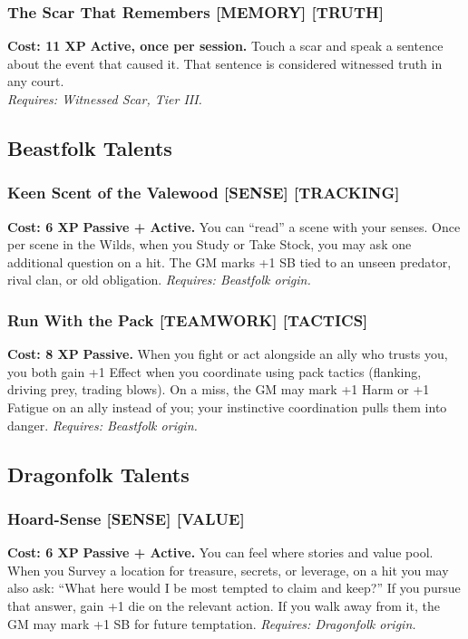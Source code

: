 \documentclass[12pt,a4paper]{book}
\begin{document}
\subsubsection*{The Scar That Remembers \textnormal{[MEMORY] [TRUTH]}}
\label{talent:scar-that-remembers}
\textbf{Cost: 11 XP} \textbf{Active, once per session.} Touch a scar and speak a sentence about the event that caused it. That sentence is considered witnessed truth in any court. \\
\textit{Requires: Witnessed Scar, Tier III.}

\subsection*{Beastfolk Talents}
\label{sec:prestige-beastfolk}

\subsubsection*{Keen Scent of the Valewood \textnormal{[SENSE] [TRACKING]}}
\label{talent:keen-scent-valewood}
\textbf{Cost: 6 XP} \textbf{Passive + Active.} You can ``read'' a scene with your senses. Once per scene in the Wilds, when you Study or Take Stock, you may ask one additional question on a hit. The GM marks +1 SB tied to an unseen predator, rival clan, or old obligation.
\textit{Requires: Beastfolk origin.}

\subsubsection*{Run With the Pack \textnormal{[TEAMWORK] [TACTICS]}}
\label{talent:run-with-the-pack}
\textbf{Cost: 8 XP} \textbf{Passive.} When you fight or act alongside an ally who trusts you, you both gain +1 Effect when you coordinate using pack tactics (flanking, driving prey, trading blows). On a miss, the GM may mark +1 Harm or +1 Fatigue on an ally instead of you; your instinctive coordination pulls them into danger.
\textit{Requires: Beastfolk origin.}

\subsection*{Dragonfolk Talents}
\label{sec:prestige-dragonfolk}

\subsubsection*{Hoard-Sense \textnormal{[SENSE] [VALUE]}}
\label{talent:hoard-sense}
\textbf{Cost: 6 XP} \textbf{Passive + Active.} You can feel where stories and value pool. When you Survey a location for treasure, secrets, or leverage, on a hit you may also ask: ``What here would I be most tempted to claim and keep?'' If you pursue that answer, gain +1 die on the relevant action. If you walk away from it, the GM may mark +1 SB for future temptation.
\textit{Requires: Dragonfolk origin.}
\end{document}
